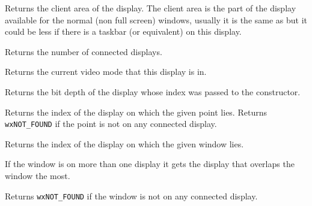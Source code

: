 \label{wxdisplaygetclientarea}


Returns the client area of the display. The client area is the part of the
display available for the normal (non full screen) windows, usually it is the
same as  but it could be less if
there is a taskbar (or equivalent) on this display.




\label{wxdisplaygetcount}


Returns the number of connected displays.


\label{wxdisplaygetcurrentmode}


Returns the current video mode that this display is in. 


\label{wxdisplaygetdepth}


Returns the bit depth of the display whose index was passed to the constructor.


\label{wxdisplaygetfrompoint}


Returns the index of the display on which the given point lies.  Returns 
\texttt{wxNOT\_FOUND} if the point is not on any connected display.




\label{wxdisplaygetfromwindow}


Returns the index of the display on which the given window lies.

If the window is on more than one display it gets the display that overlaps the window the most.

Returns \texttt{wxNOT\_FOUND} if the window is not on any connected display.

